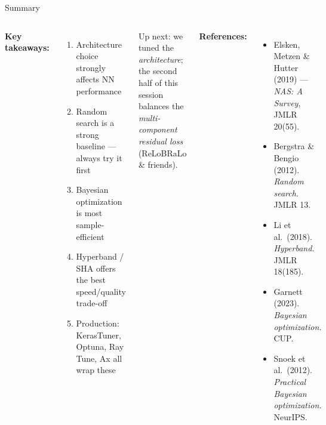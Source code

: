 \documentclass[aspectratio=169,11pt]{beamer}
\newcommand{\emphc}[1]{\textcolor{harvardcrimson}{#1}}
\begin{document}
\begin{frame}[shrink=5]{Summary}
\begin{columns}[T]
\textbf{Key takeaways:}
\begin{enumerate}
    \item Architecture choice \emphc{strongly} affects NN performance
    \item Random search is a strong baseline --- always try it first
    \item Bayesian optimization is most sample-efficient
    \item Hyperband / SHA offers the best speed/quality trade-off
    \item Production: KerasTuner, Optuna, Ray Tune, Ax all wrap these
\end{enumerate}

\vspace{0.4em}
{\small \emphc{Up next:} we tuned the \emph{architecture}; the second half of this session balances the \emph{multi-component residual loss} (ReLoBRaLo \& friends).}

\textbf{References:}
{\scriptsize
\begin{itemize}\itemsep0pt
    \item \emphc{Elsken, Metzen \& Hutter (2019)} --- \emph{NAS: A Survey}, JMLR 20(55).
    \item Bergstra \& Bengio (2012). \emph{Random search.} JMLR 13.
    \item Li et al.\ (2018). \emph{Hyperband.} JMLR 18(185).
    \item Garnett (2023). \emph{Bayesian optimization.} CUP.
    \item Snoek et al.\ (2012). \emph{Practical Bayesian optimization.} NeurIPS.
\end{itemize}
}
\end{columns}

\end{frame}
\end{document}
